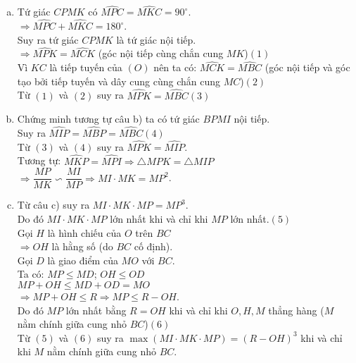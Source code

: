 \begin{ex}
{\begin{enumerate}[a)]
	\item Tứ giác $CPMK$ có $\widehat{MPC}=\widehat{MKC}=90^{\circ}$.\\
	$\Rightarrow \widehat{MPC}+\widehat{MKC}=180^{\circ}$.\\
	Suy ra tứ giác $CPMK$ là tứ giác nội tiếp.\\
	$\Rightarrow \widehat{MPK}=\widehat{MCK}$ (góc nội tiếp cùng chắn cung $MK$)\hfill$(1)$\\
	Vì $KC$ là tiếp tuyến của $(O)$ nên ta có: $\widehat{MCK}=\widehat{MBC}$ (góc nội tiếp và góc tạo bởi tiếp tuyến và dây cung cùng chắn cung $MC$)\hfill$(2)$\\
	Từ $(1)$ và $(2)$ suy ra $\widehat{MPK}=\widehat{MBC}$\hfill$(3)$
	\item Chứng minh tương tự câu b) ta có tứ giác $BPMI$ nội tiếp.\\
	Suy ra $\widehat{MIP}=\widehat{MBP}=\widehat{MBC}$\hfill$(4)$\\
	Từ $(3)$ và $(4)$ suy ra $\widehat{MPK}=\widehat{MIP}$.\\
	Tương tự: $\widehat{MKP}=\widehat{MPI}\Rightarrow \triangle MPK=\triangle MIP$\\
	$\Rightarrow \dfrac{MP}{MK}\backsim\dfrac{MI}{MP}\Rightarrow MI\cdot MK=MP^2$.
	\item Từ câu c) suy ra $MI\cdot MK\cdot MP=MP^3$.\\ 
	Do đó $MI\cdot MK\cdot MP$ lớn nhất khi và chỉ khi $MP$ lớn nhất.\hfill$(5)$\\
	Gọi $H$ là hình chiếu của $O$ trên $BC$\\
	$\Rightarrow OH$ là hằng số (do $BC$ cố định).\\
	Gọi $D$ là giao điểm của $MO$ với $BC$.\\
	Ta có: $MP\leq MD$; $OH\leq OD$\\
	$MP+OH\leq MD+OD=MO$\\
	$\Rightarrow MP+OH\leq R\Rightarrow MP\leq R-OH$.\\
	Do đó $MP$ lớn nhất bằng $R=OH$ khi và chỉ khi $O,H,M$ thẳng hàng ($M$ nằm chính giữa cung nhỏ $BC$)\hfill$(6)$\\
	Từ $(5)$ và $(6)$ suy ra $\max(MI\cdot MK\cdot MP)=(R-OH)^3$ khi và chỉ khi $M$ nằm chính giữa cung nhỏ $BC$.
	\end{enumerate}}
\end{ex}

